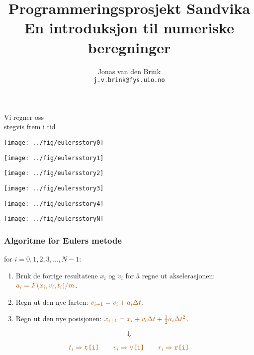 \documentclass[english, 12pt]{beamer}
\title{Programmeringsprosjekt Sandvika \\ {\small En introduksjon til numeriske beregninger}}
\author{Jonas van den Brink \\ \texttt{j.v.brink@fys.uio.no}}
\institute{\alrt Simula Research Laboratory \\ Oslo, Norway}
\newcommand{\alrt}{\color{AlertColor}}
\begin{document}
\pagestyle{empty}


\begin{frame}[fragile]
\begin{center}
{\Huge \color{DarkFern} Vi regner oss \\ stegvis frem i tid}
\end{center}
\end{frame}

\begin{frame}
\begin{center}
\texttt{[image: ../fig/eulersstory0]}
\end{center}
\end{frame}

\begin{frame}
\begin{center}
\texttt{[image: ../fig/eulersstory1]}
\end{center}
\end{frame}

\begin{frame}
\begin{center}
\texttt{[image: ../fig/eulersstory2]}
\end{center}
\end{frame}

\begin{frame}
\begin{center}
\texttt{[image: ../fig/eulersstory3]}
\end{center}
\end{frame}

\begin{frame}
\begin{center}
\texttt{[image: ../fig/eulersstory4]}
\end{center}
\end{frame}

\begin{frame}
\begin{center}
\texttt{[image: ../fig/eulersstoryN]}
\end{center}
\end{frame}


\begin{frame}[fragile]
\frametitle{Algoritme for Eulers metode}
for $i=0,1,2,3,\ldots, N-1$:
\begin{enumerate}
	\item Bruk de forrige resultatene $x_i$ og $v_i$ for å regne ut akselerasjonen: $\alrt a_i = F(x_i, v_i, t_i)/m$.
	\item Regn ut den nye farten: $\alrt v_{i+1} = v_i + a_i\Delta t$.
	\item Regn ut den nye posisjonen: $\alrt x_{i+1} = x_i + v_i\Delta t + \frac{1}{2}a_i\Delta t^2$.
\end{enumerate}
 {
$$\Downarrow$$


$$\alrt t_i \Rightarrow \texttt{t[i]} \qquad  v_i \Rightarrow \texttt{v[i]} \qquad  r_i  \Rightarrow \texttt{r[i]}$$
}
\end{frame}
\end{document}
